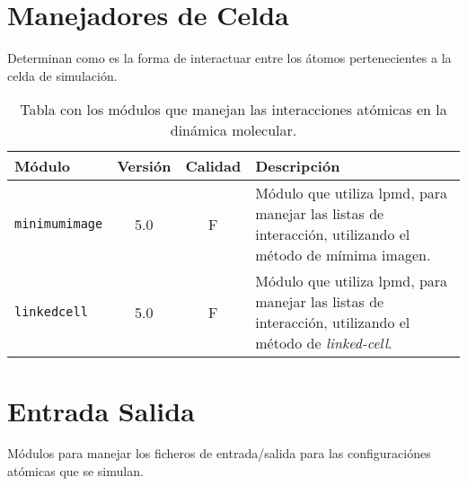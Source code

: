 \section{Manejadores de Celda}
Determinan como es la forma de interactuar entre los \'atomos pertenecientes a la celda de simulaci\'on.

\begin{table}[h!]
 \begin{tabular}{|l|c|c|p{10cm}|}\hline
 M\'odulo & Versi\'on & Calidad & Descripci\'on \\
 \hline\hline
 \texttt{minimumimage} & 5.0 & F & M\'odulo que utiliza lpmd, para manejar las listas de interacci\'on, utilizando el m\'etodo de m\'imima imagen.\\
 \hline
 \texttt{linkedcell} & 5.0 & F & M\'odulo que utiliza lpmd, para manejar las listas de interacci\'on, utilizando el m\'etodo de \textit{linked-cell}.\\
 \hline
 \end{tabular}
\label{tab:modmanager}
\caption{Tabla con los m\'odulos que manejan las interacciones at\'omicas en la din\'amica molecular.}
\end{table}

\section{Entrada Salida}
M\'odulos para manejar los ficheros de entrada/salida para las configuraci\'ones at\'omicas que se simulan.

